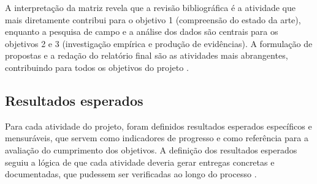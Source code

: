 A interpretação da matriz revela que a revisão bibliográfica é a atividade que mais diretamente contribui para o objetivo 1 (compreensão do estado da arte), enquanto a pesquisa de campo e a análise dos dados são centrais para os objetivos 2 e 3 (investigação empírica e produção de evidências). A formulação de propostas e a redação do relatório final são as atividades mais abrangentes, contribuindo para todos os objetivos do projeto \cite{SANTOS2024}.

\subsection{Resultados esperados}
\label{subsec:resultados_esperados_organizacao}

Para cada atividade do projeto, foram definidos resultados esperados específicos e mensuráveis, que servem como indicadores de progresso e como referência para a avaliação do cumprimento dos objetivos. A definição dos resultados esperados seguiu a lógica de que cada atividade deveria gerar entregas concretas e documentadas, que pudessem ser verificadas ao longo do processo \cite{BARDIN2016}.

